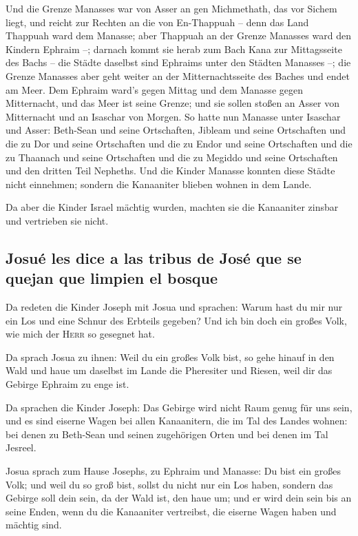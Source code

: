  Und die Grenze Manasses war von Asser an gen Michmethath,
das vor Sichem liegt, und reicht zur Rechten an die von En-Thappuah --
 denn das Land Thappuah ward dem Manasse; aber Thappuah an
der Grenze Manasses ward den Kindern Ephraim --;  darnach
kommt sie herab zum Bach Kana zur Mittagsseite des Bachs -- die Städte
daselbst sind Ephraims unter den Städten Manasses --; die Grenze
Manasses aber geht weiter an der Mitternachtsseite des Baches und endet
am Meer.  Dem Ephraim ward's gegen Mittag und dem Manasse
gegen Mitternacht, und das Meer ist seine Grenze; und sie sollen stoßen
an Asser von Mitternacht und an Isaschar von Morgen.  So
hatte nun Manasse unter Isaschar und Asser: Beth-Sean und seine
Ortschaften, Jibleam und seine Ortschaften und die zu Dor und seine
Ortschaften und die zu Endor und seine Ortschaften und die zu Thaanach
und seine Ortschaften und die zu Megiddo und seine Ortschaften und den
dritten Teil Nepheths.  Und die Kinder Manasse konnten
diese Städte nicht einnehmen; sondern die Kanaaniter blieben wohnen in
dem Lande.

 Da aber die Kinder Israel mächtig wurden, machten sie
die Kanaaniter zinsbar und vertrieben sie nicht.

\hypertarget{josuuxe9-les-dice-a-las-tribus-de-josuxe9-que-se-quejan-que-limpien-el-bosque}{%
\subsection{Josué les dice a las tribus de José que se quejan que
limpien el
bosque}\label{josuuxe9-les-dice-a-las-tribus-de-josuxe9-que-se-quejan-que-limpien-el-bosque}}

 Da redeten die Kinder Joseph mit Josua und sprachen:
Warum hast du mir nur ein Los und eine Schnur des Erbteils gegeben? Und
ich bin doch ein großes Volk, wie mich der \textsc{Herr} so gesegnet
hat.

 Da sprach Josua zu ihnen: Weil du ein großes Volk bist,
so gehe hinauf in den Wald und haue um daselbst im Lande die Pheresiter
und Riesen, weil dir das Gebirge Ephraim zu enge ist.

 Da sprachen die Kinder Joseph: Das Gebirge wird nicht
Raum genug für uns sein, und es sind eiserne Wagen bei allen
Kanaanitern, die im Tal des Landes wohnen: bei denen zu Beth-Sean und
seinen zugehörigen Orten und bei denen im Tal Jesreel.

 Josua sprach zum Hause Josephs, zu Ephraim und Manasse:
Du bist ein großes Volk; und weil du so groß bist, sollst du nicht nur
ein Los haben,  sondern das Gebirge soll dein sein, da
der Wald ist, den haue um; und er wird dein sein bis an seine Enden,
wenn du die Kanaaniter vertreibst, die eiserne Wagen haben und mächtig
sind.

